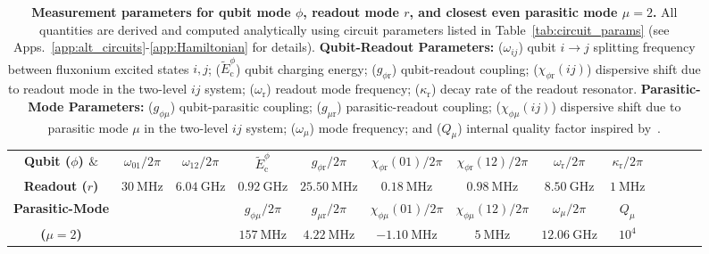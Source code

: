 \documentclass[%
reprint,
superscriptaddress,
 amsmath,amssymb,
 aps,
 prx,
longbibliography,
floatfix,
]{revtex4-2}
\begin{document}
\begin{table}[tb]
    \centering
\begin{tabular}{|c|c|c|c|c|c|c|c|c|c|c|c|c|}
    \hline
    \textbf{Qubit ($\phi$) $\&$}&$\omega_{01}/2\pi$&$\omega_{12}/2\pi$ &$\tilde{E}^\phi_\textrm{c}$ &$g_{\phi \textrm{r}}/2\pi$&$\chi_{\phi \textrm{r}}(01)/2\pi$&$\chi_{\phi \textrm{r}}(12)/2\pi$&$\omega_\textrm{r}/2\pi$&$\kappa_\textrm{r}/2\pi$\\
    \cline{2-9}
\textbf{Readout ($r$)}&$30 \ \mathrm{MHz}$& $6.04 \ \mathrm{GHz}$ & $0.92 \ \mathrm{GHz}$& $25.50 \ \mathrm{MHz}$& $0.18 \ \mathrm{MHz}$&$0.98 \ \mathrm{MHz}$&$8.50 \ \mathrm{GHz}$&$1 \ \mathrm{MHz}$\\    
\hline\textbf{Parasitic-Mode} & \multicolumn{2}{c|}{} & $g_{\phi\mu}/2\pi$&$g_{\mu \textrm{r}}/2\pi$&$\chi_{\phi\mu}(01)/2\pi$&$\chi_{\phi\mu}(12)/2\pi$&$\omega_\mu/2\pi$&$Q_\mu$\\
    \cline{4-9}
\textbf{($\mu=2$)}&\multicolumn{2}{c|}{} &$157 \ \mathrm{MHz}$& $4.22 \ \mathrm{MHz}$& $-1.10 \ \mathrm{MHz}$& $5 \ \mathrm{MHz}$& $12.06 \ \mathrm{GHz}$&$10^{4}$\\    
\hline
\end{tabular}
\caption{{\bf Measurement parameters for qubit mode $\phi$, readout mode $r$, and closest even parasitic mode $\mu=2$.} All quantities are derived and computed analytically using circuit parameters listed in Table~\ref{tab:circuit_params} (see Apps.~\ref{app:alt_circuits}-\ref{app:Hamiltonian} for details). \textbf{Qubit-Readout Parameters:} ($\omega_{ij}$) qubit $i\rightarrow j$ splitting frequency between fluxonium excited states $i, j$; ($\tilde{E}^\phi_\textrm{c}$) qubit charging energy; ($g_{\phi \textrm{r}}$) qubit-readout coupling; ($\chi_{\phi \textrm{r}}(ij)$) dispersive shift due to readout mode in the two-level $ij$ system; ($\omega_\textrm{r}$) readout mode frequency; ($\kappa_\textrm{r}$) decay rate of the readout resonator. \textbf{Parasitic-Mode Parameters:} ($g_{\phi \mu}$) qubit-parasitic coupling; ($g_{\mu \textrm{r}}$) parasitic-readout coupling; ($\chi_{\phi \mu}(ij)$) dispersive shift due to parasitic mode $\mu$ in the two-level $ij$ system; ($\omega_\mu$) mode frequency; and ($Q_\mu$) internal quality factor inspired by~\cite{masluk_microwave_2012}.}   \label{tab:readout_params}
\end{table}



\end{document}
